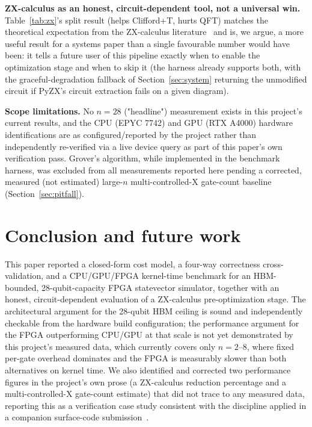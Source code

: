 \documentclass[pdflatex,sn-mathphys,Numbered]{sn-jnl}
\begin{document}
\textbf{ZX-calculus as an honest, circuit-dependent tool, not a universal win.} Table~\ref{tab:zx}'s split result (helps Clifford+T, hurts QFT) matches the theoretical expectation from the ZX-calculus literature~\cite{vandewetering2020} and is, we argue, a more useful result for a systems paper than a single favourable number would have been: it tells a future user of this pipeline exactly when to enable the optimization stage and when to skip it (the harness already supports both, with the graceful-degradation fallback of Section~\ref{sec:system} returning the unmodified circuit if PyZX's circuit extraction fails on a given diagram).

\textbf{Scope limitations.} No $n=28$ ("headline") measurement exists in this project's current results, and the CPU (EPYC 7742) and GPU (RTX A4000) hardware identifications are as configured/reported by the project rather than independently re-verified via a live device query as part of this paper's own verification pass. Grover's algorithm, while implemented in the benchmark harness, was excluded from all measurements reported here pending a corrected, measured (not estimated) large-$n$ multi-controlled-X gate-count baseline (Section~\ref{sec:pitfall}).

\section{Conclusion and future work}\label{sec:conclusion}

This paper reported a closed-form cost model, a four-way correctness cross-validation, and a CPU/GPU/FPGA kernel-time benchmark for an HBM-bounded, 28-qubit-capacity FPGA statevector simulator, together with an honest, circuit-dependent evaluation of a ZX-calculus pre-optimization stage. The architectural argument for the 28-qubit HBM ceiling is sound and independently checkable from the hardware build configuration; the performance argument for the FPGA outperforming CPU/GPU at that scale is not yet demonstrated by this project's measured data, which currently covers only $n=2$--8, where fixed per-gate overhead dominates and the FPGA is measurably slower than both alternatives on kernel time. We also identified and corrected two performance figures in the project's own prose (a ZX-calculus reduction percentage and a multi-controlled-X gate-count estimate) that did not trace to any measured data, reporting this as a verification case study consistent with the discipline applied in a companion surface-code submission~\cite{ali_surface_code}.
\end{document}
